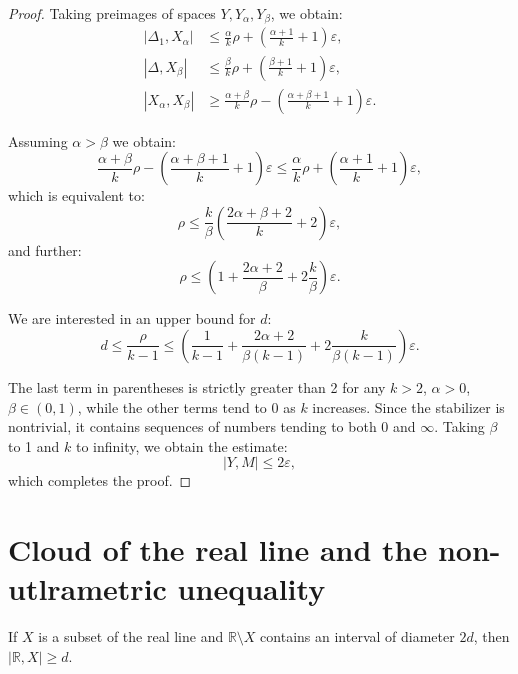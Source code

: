 \documentclass[leqno]{article}
\begin{document}
\begin{proof}
  Taking preimages of spaces $Y, Y_{\alpha}, Y_{\beta}$, we obtain:
  \begin{align*}
    |\Delta_1, X_{\alpha}| &\leq \frac{\alpha}{k}\rho +
    \left(\frac{\alpha+1}{k} + 1\right)\varepsilon, \\
    |\Delta, X_{\beta}| &\leq \frac{\beta}{k}\rho +
    \left(\frac{\beta+1}{k}+1\right)\varepsilon, \\
    |X_\alpha, X_{\beta}| &\geq \frac{\alpha+\beta}{k}\rho -
    \left(\frac{\alpha+\beta+1}{k}+1\right)\varepsilon.
  \end{align*}

  Assuming $\alpha > \beta$ we obtain:
  $$
  \frac{\alpha+\beta}{k}\rho -
  \left(\frac{\alpha+\beta+1}{k}+1\right)\varepsilon \leq
  \frac{\alpha}{k}\rho + \left(\frac{\alpha+1}{k} + 1\right)\varepsilon,
  $$
  which is equivalent to:
  $$
  \rho \leq \frac{k}{\beta}\left(\frac{2\alpha+\beta+2}{k}+2\right)\varepsilon,
  $$
  and further:
  $$
  \rho \leq \left(1+\frac{2\alpha + 2}{\beta} +
  2\frac{k}{\beta}\right)\varepsilon.
  $$

  We are interested in an upper bound for $d$:
  $$
  d \leq \frac{\rho}{k-1} \leq \left(\frac{1}{k-1}+\frac{2\alpha +
  2}{\beta(k-1)} + 2\frac{k}{\beta(k-1)}\right)\varepsilon.
  $$

  The last term in parentheses is strictly greater than 2 for any
  $k>2$, $\alpha>0$, $\beta\in (0,1)$, while the other terms tend to
  0 as $k$ increases. Since the stabilizer is nontrivial, it contains
  sequences of numbers tending to both 0 and $\infty$. Taking $\beta$
  to 1 and $k$ to infinity, we obtain the estimate:
  $$
  |Y, M| \leq 2\varepsilon,
  $$
  which completes the proof.
\end{proof}

\section{Cloud of the real line and the non-utlrametric unequality}

\begin{lemma}\label{lemmaDiamDist}
  If $X$ is a subset of the real line and $\mathbb{R}\setminus X$
  contains an interval of diameter $2d$, then $|\mathbb{R}, X| \ge d$.
\end{lemma}
\end{document}

